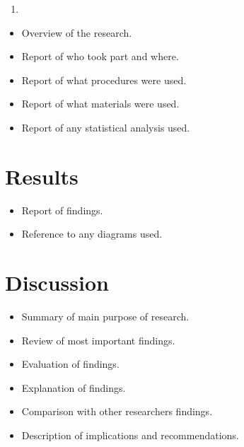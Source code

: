 \documentclass{sig-alternate}
\begin{document}
\begin{enumerate}
	\item 
\end{enumerate}


\begin{itemize}
	\item Overview of the research.
	\item Report of who took part and where.
	\item Report of what procedures were used.
	\item Report of what materials were used.
	\item Report of any statistical analysis used.
\end{itemize}


\section{Results} %
\label{sec:results}
\begin{itemize}
	\item Report of findings.
	\item Reference to any diagrams used.
\end{itemize}

\section{Discussion} %
\label{sec:discussion}
\begin{itemize}
	\item Summary of main purpose of research.
	\item Review of most important findings.
	\item Evaluation of findings.
	\item Explanation of findings.
	\item Comparison with other researchers findings.
	\item Description of implications and recommendations.
\end{itemize}




%
%
\end{document}
